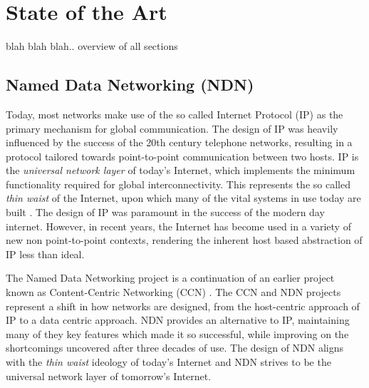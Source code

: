 \chapter{State of the Art}
blah blah blah.. overview of all sections

\section{Named Data Networking (NDN)}\label{sec:ndn-sota}
Today, most networks make use of the so called Internet Protocol (IP) as the primary mechanism for global communication. The design of IP was heavily influenced by the success of the 20th century telephone networks, resulting in a protocol tailored towards point-to-point communication between two hosts. IP is the \textit{universal network layer} of today's Internet, which implements the minimum functionality required for global interconnectivity. This represents the so called \textit{thin waist} of the Internet, upon which many of the vital systems in use today are built \cite{ndn-exec-summary}. The design of IP was paramount in the success of the modern day internet. However, in recent years, the Internet has become used in a variety of new non point-to-point contexts, rendering the inherent host based abstraction of IP less than ideal.  

The Named Data Networking project is a continuation of an earlier project known as Content-Centric Networking (CCN) \cite{vj-named-content}. The CCN and NDN projects represent a shift in how networks are designed, from the host-centric approach of IP to a data centric approach. NDN provides an alternative to IP, maintaining many of they key features which made it so successful, while improving on the shortcomings uncovered after three decades of use. The design of NDN aligns with the \textit{thin waist} ideology of today's Internet and NDN strives to be the universal network layer of tomorrow's Internet. 


